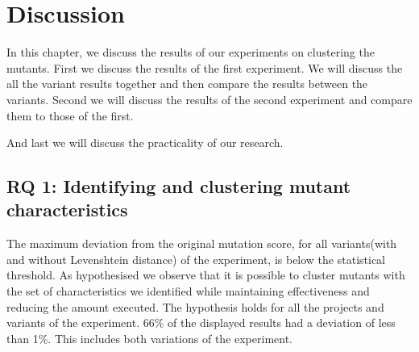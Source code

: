 \documentclass[../main]{subfiles}
\begin{document}
\chapter{Discussion}
\label{ch:discussion}
In this chapter, we discuss the results of our experiments on clustering the mutants.
First we discuss the results of the first experiment. 
We will discuss the all the variant results together and then compare the results between the variants.
Second we will discuss the results of the second experiment and compare them to those of the first.

And last we will discuss the practicality of our research.

\section{RQ 1: Identifying and clustering mutant characteristics}
The maximum deviation from the original mutation score, for all variants(with and without Levenshtein distance) of the experiment, is below the statistical threshold.
As hypothesised we observe that it is possible to cluster mutants with the set of characteristics we identified while maintaining effectiveness and reducing the amount executed.
The hypothesis holds for all the projects and variants of the experiment.
66\% of the displayed results had a deviation of less than 1\%. 
This includes both variations of the experiment.
\end{document}
